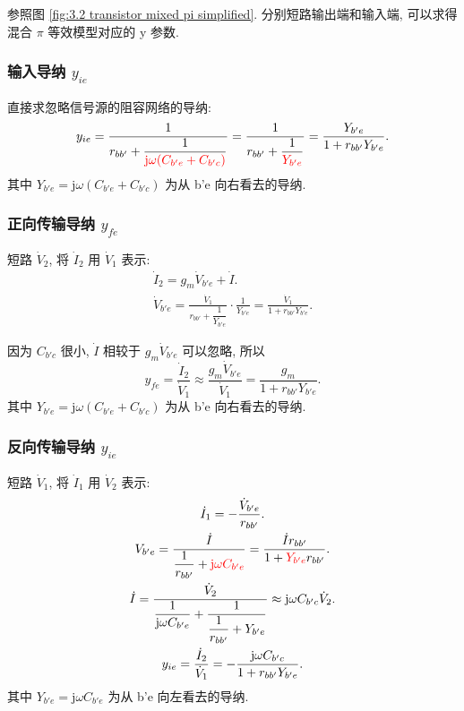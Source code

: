 参照图 \ref{fig:3.2 transistor mixed pi simplified}. 分别短路输出端和输入端, 可以求得混合 $\pi$ 等效模型对应的 y 参数.

\subsubsection{输入导纳 \texorpdfstring{$y_{ie}$}{y ie}}
直接求忽略信号源的阻容网络的导纳:
\begin{equation}
    y_{ie}=\frac{1}{r_{bb'}+\dfrac{1}{\color{red} \mathrm{j}\omega(C_{b'e}+C_{b'c})}}=\frac{1}{r_{bb'}+\dfrac{1}{\color{red} Y_{b'e}}}=\frac{Y_{b'e}}{1+r_{bb'}Y_{b'e}}.
\end{equation}
其中 $Y_{b'e}=\mathrm{j}\omega(C_{b'e}+C_{b'c})$ 为从 b'e 向右看去的导纳.

\subsubsection{正向传输导纳 \texorpdfstring{$y_{fe}$}{y fe}}
短路 $\dot{V}_2$, 将 $\dot{I}_2$ 用 $\dot{V}_1$ 表示:
\srmg
\begin{gather}
    \dot{I}_2=g_m\dot{V}_{b'e}+\dot{I}. \\
    \dot{V}_{b'e}=\frac{\dot{V}_1}{r_{bb'}+\dfrac{1}{Y_{b'e}}}\cdot\frac{1}{Y_{b'e}}=\frac{\dot{V}_1}{1+r_{bb'}Y_{b'e}}.
\end{gather}

因为 $C_{b'c}$ 很小, $\dot{I}$ 相较于 $g_m\dot{V}_{b'e}$ 可以忽略, 所以
\begin{equation}
    y_{fe}=\frac{\dot{I}_2}{\dot{V}_1}\approx\frac{g_m\dot{V}_{b'e}}{\dot{V}_1}=\frac{g_m}{1+r_{bb'}Y_{b'e}}.
\end{equation}
其中 $Y_{b'e}=\mathrm{j}\omega(C_{b'e}+C_{b'c})$ 为从 b'e 向右看去的导纳.

\subsubsection{反向传输导纳 \texorpdfstring{$y_{ie}$}{y ie}}
短路 $\dot{V}_1$, 将 $\dot{I}_1$ 用 $\dot{V}_2$ 表示:
\begin{gather}
    \dot{I}_1=-\frac{\dot{V}_{b'e}}{r_{bb'}}. \\
    V_{b'e}=\frac{\dot{I}}{\dfrac{1}{r_{bb'}}+{\color{red} \mathrm{j}\omega C_{b'e}}}=\frac{\dot{I}r_{bb'}}{1+{\color{red} Y_{b'e}}r_{bb'}}. \label{eq:proofs transistor mixed pi y ie V b'e} \\
    \dot{I}=\frac{\dot{V}_2}{\dfrac{1}{\mathrm{j}\omega C_{b'e}}+\dfrac{1}{\dfrac{1}{r_{bb'}}+Y_{b'e}}}\approx \mathrm{j}\omega C_{b'c}\dot{V}_2. \label{eq:proofs transistor mixed pi y ie I} \\
    y_{ie}=\frac{\dot{I}_2}{\dot{V}_1}=-\frac{\mathrm{j}\omega C_{b'c}}{1+r_{bb'}Y_{b'e}}.
\end{gather}
其中 $Y_{b'e}=\mathrm{j}\omega C_{b'e}$ 为从 b'e 向左看去的导纳.

